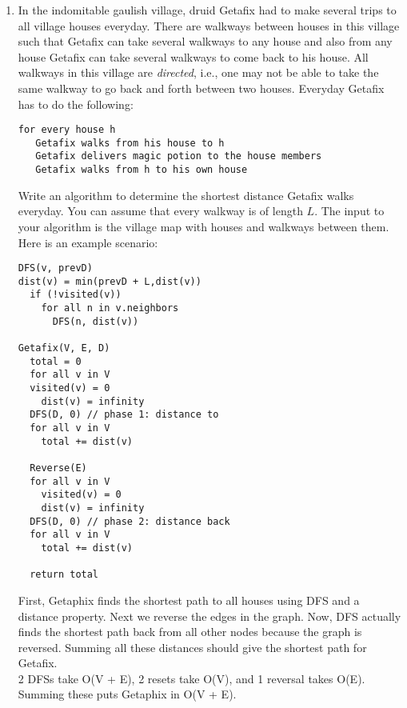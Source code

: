 \documentclass[11pt]{article}
\begin{document}
\begin{enumerate}

  
\item 
In the indomitable gaulish village, druid Getafix had to make several
trips to all village houses everyday. There are walkways between
houses in this village such that Getafix can take several walkways to
any house and also from any house Getafix can take several walkways to
come back to his house.  All walkways in this village are
\emph{directed}, i.e., one may not be able to take the same
walkway to go back and forth between two houses. Everyday Getafix
has to do the following:
\begin{verbatim}
for every house h
   Getafix walks from his house to h
   Getafix delivers magic potion to the house members
   Getafix walks from h to his own house
\end{verbatim}
Write an algorithm to determine the shortest distance Getafix walks
everyday.  You can assume that every walkway is of length $L$.  The input
to your algorithm is the village map with houses and walkways between
them. Here is an example scenario:
\begin{center}
\end{center}

\begin{verbatim}
DFS(v, prevD)
dist(v) = min(prevD + L,dist(v))
  if (!visited(v))
    for all n in v.neighbors
      DFS(n, dist(v))

Getafix(V, E, D)
  total = 0
  for all v in V
  visited(v) = 0
    dist(v) = infinity
  DFS(D, 0) // phase 1: distance to
  for all v in V
    total += dist(v)

  Reverse(E)
  for all v in V
    visited(v) = 0
    dist(v) = infinity
  DFS(D, 0) // phase 2: distance back
  for all v in V
    total += dist(v)

  return total

\end{verbatim}

First, Getaphix finds the shortest path to all houses using DFS and a distance property.
Next we reverse the edges in the graph.
Now, DFS actually finds the shortest path back from all other nodes because the graph is reversed.
Summing all these distances should give the shortest path for Getafix. \\
2 DFSs take O(V + E), 2 resets take O(V), and 1 reversal takes O(E).
Summing these puts Getaphix in O(V + E).


\end{enumerate}
\end{document}
